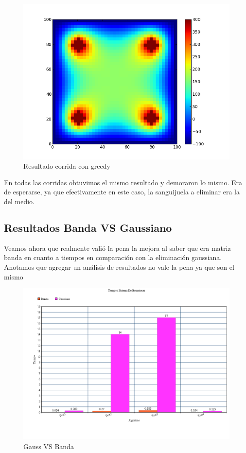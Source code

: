 \begin{figure}[htb]
\begin{center}
\includegraphics[scale=0.40]{imagenes/random_2.png} 
\caption{Resultado corrida con greedy} 
\end{center}
\end{figure}


En todas las corridas obtuvimos el mismo resultado y demoraron lo mismo. Era de esperarse, ya que efectivamente en este caso, la sanguijuela a eliminar era la del medio.
\newpage
\subsection{Resultados Banda VS Gaussiano}
Veamos ahora que realmente valió la pena la mejora al saber que era matriz banda en cuanto a tiempos en comparación con la eliminación gaussiana.
Anotamos que agregar un análisis de resultados no vale la pena ya que son el mismo

\begin{figure}[htb]
\begin{center}
\includegraphics[scale=0.50]{imagenes/tiemposGaussVsBanda.png} 
\caption{Gauss VS Banda} 
\end{center}
\end{figure}
\clearpage

